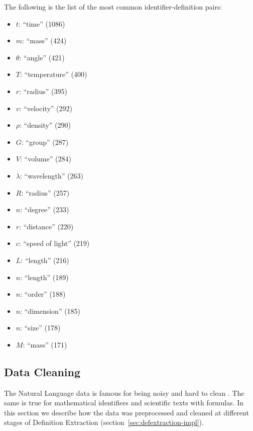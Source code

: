 The following is the list of the most common identifier-definition pairs:

\begin{itemize}
\item $t$: ``time'' (1086)
\item $m$: ``mass'' (424)
\item $\theta$: ``angle'' (421)
\item $T$: ``temperature'' (400)
\item $r$: ``radius'' (395)
\item $v$: ``velocity'' (292)
\item $\rho$: ``density'' (290)
\item $G$: ``group'' (287)
\item $V$: ``volume'' (284)
\item $\lambda$: ``wavelength'' (263)
\item $R$: ``radius'' (257)
\item $n$: ``degree'' (233)
\item $r$: ``distance'' (220)
\item $c$: ``speed of light'' (219)
\item $L$: ``length'' (216)
\item $n$: ``length'' (189)
\item $n$: ``order'' (188)
\item $n$: ``dimension'' (185)
\item $n$: ``size'' (178)
\item $M$: ``mass'' (171)
\end{itemize}



\subsection{Data Cleaning} \label{sec:datacleaning}

The Natural Language data is famous for being noisy and hard to 
clean \cite{sonntag2004assessing}. The same is true for 
mathematical identifiers and  scientific texts with formulas. 
In this section we describe how the data was preprocessed and 
cleaned at different stages of Definition Extraction 
(section~\ref{sec:defextraction-impl}).


